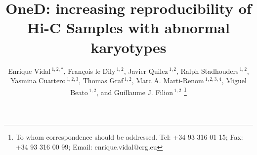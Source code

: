 \documentclass[a4,center,fleqn]{NAR}
\begin{document}
\title{OneD: increasing reproducibility of Hi-C Samples with abnormal
karyotypes}

\author{%
Enrique Vidal\,$^{1,2,*}$,
Fran\c{c}ois le Dily\,$^{1,2}$,
Javier Quilez\,$^{1,2}$,
Ralph Stadhouders\,$^{1,2}$,
Yasmina Cuartero\,$^{1,2,3}$,
Thomas Graf\,$^{1,2}$,
Marc A.  Marti-Renom\,$^{1,2,3,4}$,
Miguel Beato\,$^{1,2}$,
and Guillaume J. Filion\,$^{1,2}$%
\footnote{To whom correspondence should be addressed.
Tel: +34 93 316 01 15; Fax: +34 93 316 00 99; Email: enrique.vidal@crg.eu}}

\address{%
$^{1}$Gene Regulation, Stem Cells and Cancer Program, Centre for
Genomic Regulation (CRG), The Barcelona Institute of Science and
Technology (BIST), Dr. Aiguader 88, 08003, Barcelona, Spain
and
$^{2}$Universitat Pompeu Fabra (UPF), Barcelona, Spain
and
$^{3}$CNAG-CRG, Centre for Genomic Regulation (CRG), Barcelona
Institute of Science and Technology (BIST), Baldiri i Reixac 4, 08028
Barcelona, Spain
and
$^{4}$ICREA, Pg. Llu\'is Companys 23, 08010 Barcelona, Spain}



\maketitle
\end{document}
